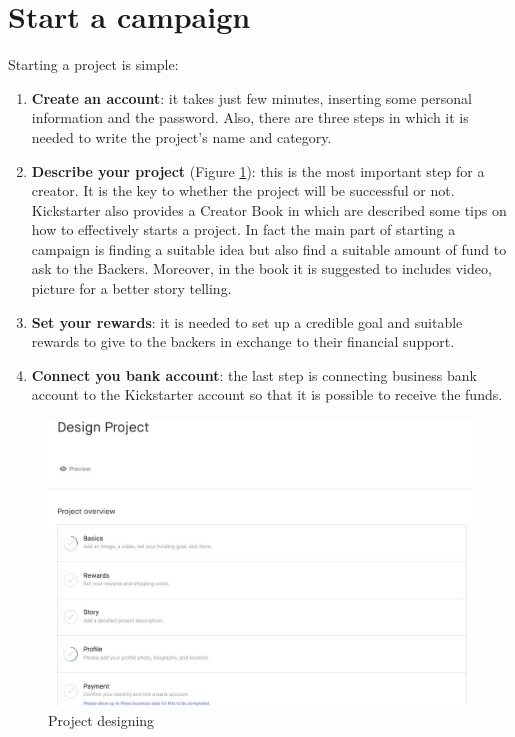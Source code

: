 \documentclass{report}
\begin{document}
\section{Start a campaign}\label{campaign}
Starting a project is simple: 
\begin{enumerate}
    \item \textbf{Create an account}: it takes just few minutes, inserting some personal information and the password. Also, there are three steps in which it is needed to write the project's name and category. 
    \item \textbf{Describe your project} (Figure \ref{fig:prj}): this is the most important step for a creator. It is the key to whether the project will be successful or not. Kickstarter also provides a Creator Book in which are described some tips on how to effectively starts a project. In fact the main part of starting a campaign is finding a suitable idea but also find a suitable amount of fund to ask to the Backers. Moreover, in the book it is suggested to includes video, picture for a better story telling.  
    \item \textbf{Set your rewards}: it is needed to set up a credible goal and suitable rewards to give to the backers in exchange to their financial support. 
    \item \textbf{Connect you bank account}: the last step is connecting business bank account to the Kickstarter account so that it is possible to receive the funds.
    
\end{enumerate}

\begin{figure}
    \centering
    \includegraphics[width=0.85\linewidth]{figuras/project.jpg}
    \caption{Project designing}
    \label{fig:prj}
\end{figure}
\end{document}
